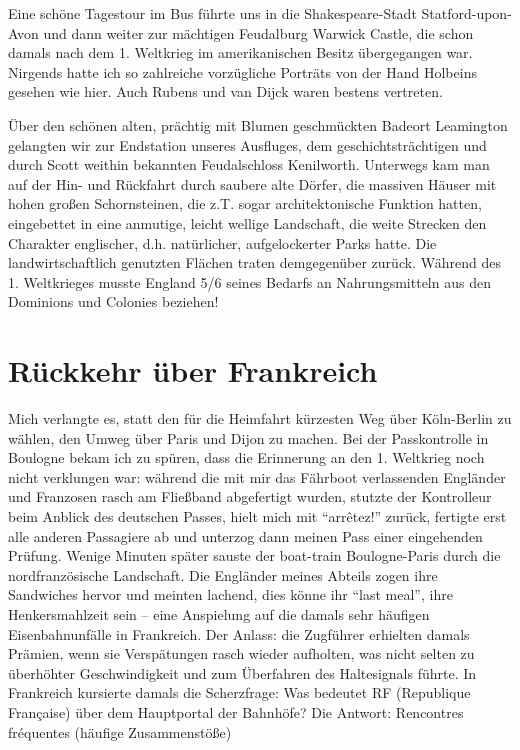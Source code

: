 Eine schöne Tagestour im Bus führte uns in die Shakespeare-Stadt Statford-upon-Avon und dann weiter zur mächtigen Feudalburg Warwick Castle, die schon damals nach dem 1. Weltkrieg im amerikanischen Besitz übergegangen war. Nirgends hatte ich so zahlreiche vorzügliche Porträts von der Hand Holbeins gesehen wie hier. Auch Rubens und van Dijck waren bestens vertreten.

Über den schönen alten, prächtig mit Blumen geschmückten Badeort Lea\-ming\-ton gelangten wir zur Endstation unseres Ausfluges, dem geschichtsträchtigen und durch Scott weithin bekannten Feudalschloss Kenilworth. Unterwegs kam man auf der Hin- und Rückfahrt durch saubere alte Dörfer, die massiven Häuser mit hohen großen Schornsteinen, die z.T. sogar architektonische Funktion hatten, eingebettet in eine anmutige, leicht wellige Landschaft, die weite Strecken den Charakter englischer, d.h. natürlicher, aufgelockerter Parks hatte. Die landwirtschaftlich genutzten Flächen traten demgegenüber zurück. Während des 1. Weltkrieges musste England 5/6 seines Bedarfs an Nahrungsmitteln aus den Dominions und Colonies beziehen!

\section{Rückkehr über Frankreich}
Mich verlangte es, statt den für die Heimfahrt kürzesten Weg über Köln-Berlin zu wählen, den Umweg über Paris und Dijon zu machen. Bei der Passkontrolle in Boulogne bekam ich zu spüren, dass die Erinnerung an den 1. Weltkrieg noch nicht verklungen war: während die mit mir das Fährboot verlassenden Engländer und Franzosen rasch am Fließband abgefertigt wurden, stutzte der Kontrolleur beim Anblick des deutschen Passes, hielt mich mit \enquote{arrêtez!} zurück, fertigte erst alle anderen Passagiere ab und unterzog dann meinen Pass einer eingehenden Prüfung. Wenige Minuten später sauste der boat-train Boulogne-Paris durch die nordfranzösische Landschaft. Die Engländer meines Abteils zogen ihre Sandwiches hervor und meinten lachend, dies könne ihr \enquote{last meal}, ihre Henkersmahlzeit sein -- eine Anspielung auf die damals sehr häufigen Eisenbahnunfälle in Frankreich. Der Anlass: die Zugführer erhielten damals Prämien, wenn sie Verspätungen rasch wieder aufholten, was nicht selten zu überhöhter Geschwindigkeit und zum Überfahren des Haltesignals führte. In Frankreich kursierte damals die Scherzfrage: Was bedeutet RF (Republique Française) über dem Hauptportal der Bahnhöfe? Die Antwort: Rencontres fréquentes (häufige Zusammenstöße)

